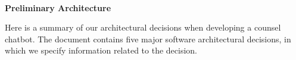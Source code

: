 \documentclass[pdftex, 10pt, norsk, a4paper, twoside]{article}
\numberwithin{equation}{section}
\numberwithin{figure}{section}
\numberwithin{table}{section}
\begin{document}
\makeatletter


\newcommand*{\rom}[1]{\expandafter\@slowromancap\romannumeral #1@}
\makeatother
\hfill\\ %

\begin{center} %
\LARGE{\textbf{Preliminary Architecture}}

\abstract Here is a summary of our architectural decisions when developing a counsel chatbot. The document contains five major software architectural decisions, in which we specify information related to the decision. %

\tableofcontents

\newpage %
 
\hfill
\section*{}


\end{center}
\end{document}
